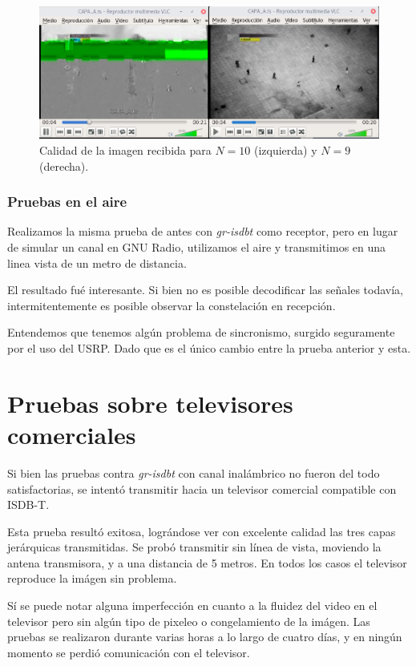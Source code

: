 \begin{figure}[!h]
	\centering
	\includegraphics[scale=0.4]{figuras/cap06/calidad_imagen}
	\caption{\label{f:calidad_imagen} Calidad de la imagen recibida para $N=10$ (izquierda) y $N=9$ (derecha).}
\end{figure}

\subsubsection{Pruebas en el aire}

Realizamos la misma prueba de antes con \textit{gr-isdbt} como receptor, pero en lugar de simular un canal en GNU Radio, utilizamos el aire y transmitimos en una linea vista de un metro de distancia.

El resultado fué interesante. Si bien no es posible decodificar las señales todavía, intermitentemente es posible observar la constelación en recepción. 

Entendemos que tenemos algún problema de sincronismo, surgido seguramente por el uso del USRP. Dado que es el único cambio entre la prueba anterior y esta.
 

\section{Pruebas sobre televisores comerciales}

Si bien las pruebas contra \textit{gr-isdbt} con canal inalámbrico no fueron del todo satisfactorias, se intentó transmitir hacia un televisor comercial compatible con ISDB-T. 

Esta prueba resultó exitosa, lográndose ver con excelente calidad las tres capas jerárquicas transmitidas. Se probó transmitir sin línea de vista, moviendo la antena transmisora, y a una distancia de 5 metros. En todos los casos el televisor reproduce la imágen sin problema.

Sí se puede notar alguna imperfección en cuanto a la fluidez del video en el televisor pero sin algún tipo de pixeleo o congelamiento de la imágen. Las pruebas se realizaron durante varias horas a lo largo de cuatro días, y en ningún momento se perdió comunicación con el televisor.



